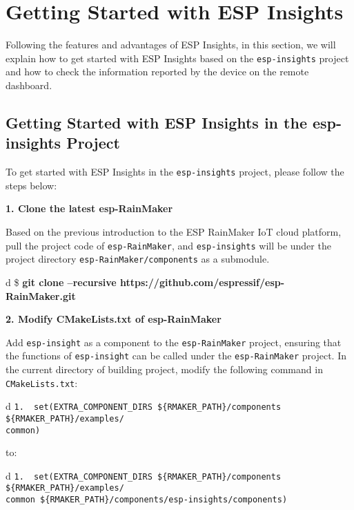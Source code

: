 \documentclass[a4paper,12pt]{book}
\begin{document}
\section{Getting Started with ESP Insights}
Following the features and advantages of ESP Insights, in this section, we will explain how to get started with ESP Insights based on the \verb|esp-insights| project and how to check the information reported by the device on the remote dashboard.

\subsection{Getting Started with ESP Insights in the esp-insights Project}
To get started with ESP Insights in the \verb|esp-insights| project, please follow the steps below:

\textbf{1. Clone the latest esp-RainMaker}

Based on the previous introduction to the ESP RainMaker IoT cloud platform, pull the project code of \verb|esp-RainMaker|, and \verb|esp-insights| will be under the project directory \verb|esp-RainMaker/components| as a submodule.

\begin{codebloc}
\begin{tabular}{d}
\$ \textbf{git clone --recursive https://github.com/espressif/esp-RainMaker.git}
\end{tabular}
\end{codebloc}

\textbf{2. Modify CMakeLists.txt of esp-RainMaker}

Add \verb|esp-insight| as a component to the \verb|esp-RainMaker| project, ensuring that the functions of \verb|esp-insight| can be called under the \verb|esp-RainMaker| project. In the current directory of building project, modify the following command in \verb|CMakeLists.txt|:

\begin{codebloc}
\begin{tabular}{d}
\verb|1.  set(EXTRA_COMPONENT_DIRS ${RMAKER_PATH}/components ${RMAKER_PATH}/examples/|\\
\verb|common)|
\end{tabular}
\end{codebloc}

to:

\begin{codebloc}
\begin{tabular}{d}
\verb|1.  set(EXTRA_COMPONENT_DIRS ${RMAKER_PATH}/components ${RMAKER_PATH}/examples/|\\
\verb|common ${RMAKER_PATH}/components/esp-insights/components)|
\end{tabular}
\end{codebloc}
\end{document}
